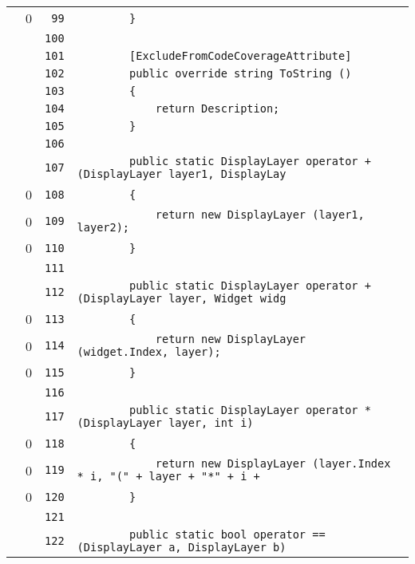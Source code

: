 \documentclass[a4paper,10pt]{article}
\begin{document}
\begin{longtable}[l]{lrrl}
\cellcolor{red} & 0 & \verb~99~ & \verb~        }~\\
\cellcolor{gray} &  & \verb~100~ & \verb~~\\
\cellcolor{gray} &  & \verb~101~ & \verb~        [ExcludeFromCodeCoverageAttribute]~\\
\cellcolor{gray} &  & \verb~102~ & \verb~        public override string ToString ()~\\
\cellcolor{gray} &  & \verb~103~ & \verb~        {~\\
\cellcolor{gray} &  & \verb~104~ & \verb~            return Description;~\\
\cellcolor{gray} &  & \verb~105~ & \verb~        }~\\
\cellcolor{gray} &  & \verb~106~ & \verb~~\\
\cellcolor{gray} &  & \verb~107~ & \verb~        public static DisplayLayer operator + (DisplayLayer layer1, DisplayLay~\\
\cellcolor{red} & 0 & \verb~108~ & \verb~        {~\\
\cellcolor{red} & 0 & \verb~109~ & \verb~            return new DisplayLayer (layer1, layer2);~\\
\cellcolor{red} & 0 & \verb~110~ & \verb~        }~\\
\cellcolor{gray} &  & \verb~111~ & \verb~~\\
\cellcolor{gray} &  & \verb~112~ & \verb~        public static DisplayLayer operator + (DisplayLayer layer, Widget widg~\\
\cellcolor{red} & 0 & \verb~113~ & \verb~        {~\\
\cellcolor{red} & 0 & \verb~114~ & \verb~            return new DisplayLayer (widget.Index, layer);~\\
\cellcolor{red} & 0 & \verb~115~ & \verb~        }~\\
\cellcolor{gray} &  & \verb~116~ & \verb~~\\
\cellcolor{gray} &  & \verb~117~ & \verb~        public static DisplayLayer operator * (DisplayLayer layer, int i)~\\
\cellcolor{red} & 0 & \verb~118~ & \verb~        {~\\
\cellcolor{red} & 0 & \verb~119~ & \verb~            return new DisplayLayer (layer.Index * i, "(" + layer + "*" + i + ~\\
\cellcolor{red} & 0 & \verb~120~ & \verb~        }~\\
\cellcolor{gray} &  & \verb~121~ & \verb~~\\
\cellcolor{gray} &  & \verb~122~ & \verb~        public static bool operator == (DisplayLayer a, DisplayLayer b)~\\

\end{longtable}
\end{document}
